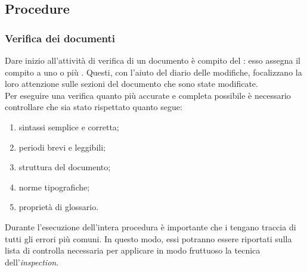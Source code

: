 	\subsection{Procedure}
		\subsubsection{Verifica dei documenti}
			Dare inizio all'attività di verifica di un documento è compito del : esso assegna il compito a uno o più . 
			Questi, con l'aiuto del diario delle modifiche, focalizzano la loro attenzione sulle sezioni del documento che sono state modificate.\\
			Per eseguire una verifica quanto più accurate e completa possibile è necessario controllare che sia stato rispettato quanto segue:
			\begin{enumerate}
				\item sintassi semplice e corretta;
				\item periodi brevi e leggibili;
				\item struttura del documento;
				\item norme tipografiche;
				\item proprietà di glossario.
			\end{enumerate}
			Durante l'esecuzione dell'intera procedura è importante che i  tengano traccia di tutti gli errori più comuni. In questo modo, 
			essi potranno essere riportati sulla lista di controlla necessaria per applicare in modo fruttuoso la tecnica dell'\textit{inspection}.

